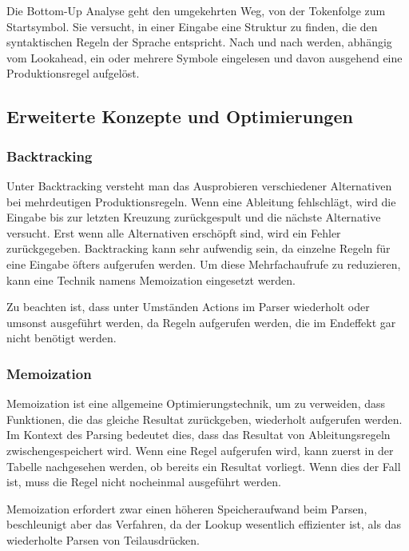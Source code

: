 Die Bottom-Up Analyse geht den umgekehrten Weg, von der Tokenfolge zum Startsymbol. Sie versucht, in einer Eingabe eine Struktur zu finden, die den syntaktischen Regeln der Sprache entspricht. Nach und nach werden, abhängig vom Lookahead, ein oder mehrere Symbole eingelesen und davon ausgehend eine Produktionsregel aufgelöst.


\subsection{Erweiterte Konzepte und Optimierungen}
\label{theorie_erweiterte_konzepte}

\subsubsection{Backtracking} 

Unter Backtracking versteht man das Ausprobieren verschiedener Alternativen bei mehrdeutigen Produktionsregeln. Wenn eine Ableitung fehlschlägt, wird die Eingabe bis zur letzten Kreuzung zurückgespult und die nächste Alternative versucht. Erst wenn alle Alternativen erschöpft sind, wird ein Fehler zurückgegeben. Backtracking kann sehr aufwendig sein, da einzelne Regeln für eine Eingabe öfters aufgerufen werden. Um diese Mehrfachaufrufe zu reduzieren, kann eine Technik namens Memoization eingesetzt werden.

Zu beachten ist, dass unter Umständen Actions im Parser wiederholt oder umsonst ausgeführt werden, da Regeln aufgerufen werden, die im Endeffekt gar nicht benötigt werden.

\subsubsection{Memoization}

Memoization ist eine allgemeine Optimierungstechnik, um zu verweiden, dass Funktionen, die das gleiche Resultat zurückgeben,  wiederholt aufgerufen werden. Im Kontext des Parsing bedeutet dies, dass das Resultat von Ab\-lei\-tungs\-re\-geln zwischengespeichert wird. Wenn eine Regel aufgerufen wird, kann zuerst in der Tabelle nachgesehen werden, ob bereits ein Resultat vorliegt. Wenn dies der Fall ist, muss die Regel nicht nocheinmal ausgeführt werden.

Memoization erfordert zwar einen höheren Speicheraufwand beim Parsen, beschleunigt aber das Verfahren, da der Lookup wesentlich effizienter ist, als das wiederholte Parsen von Teilausdrücken.

